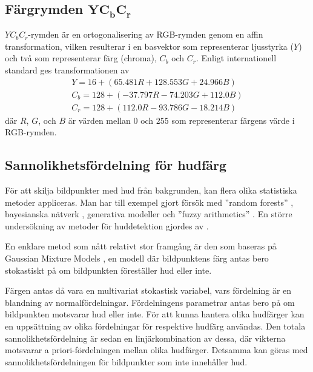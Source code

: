 \documentclass[../rapport_MVEX01-11-05]{subfiles}
\begin{document}
\subsection[Färgrymden $\mathrm{YC_bC_r}$]{Färgrymden $\mathbf{YC_bC_r}$}
$YC_bC_r$-rymden är en ortogonalisering av RGB-rymden genom en
affin transformation, vilken resulterar i en basvektor som
representerar ljusstyrka ($Y$) och två som representerar färg (chroma), $C_b$ och $C_r$. Enligt
internationell standard \cite{ITU-BT601} ges
transformationen av
\begin{equation*}
  \label{eq:farg:ycbcr}
  \begin{gathered}
  Y   = 16  + ( 65.481R + 128.553G + 24.966B)\\
  C_b = 128 + (-37.797R - 74.203G  + 112.0B )\\
  C_r = 128 + (112.0R   - 93.786G  - 18.214B)
  \end{gathered}
\end{equation*}
där $R$, $G$, och $B$ är värden mellan $0$ och $255$ som representerar
färgens värde i RGB-rymden.

\subsection{Sannolikhetsfördelning för hudfärg}\label{sec:klassificering:hud}
För att skilja bildpunkter med hud från bakgrunden,
kan flera olika statistiska metoder
appliceras. Man har till exempel gjort försök med 
''random forests''
\cite{Khan10}, bayesianska nätverk \cite{Sebe04}, generativa modeller
\cite{Kruppa02}
och ''fuzzy arithmetics'' \cite{Shang10}. En större undersökning av metoder
för huddetektion gjordes av .

En enklare metod som nått relativt stor framgång är den som baseras på
Gaus\-sian Mixture Models \cite{Elmezain08,Hassanpour08}, en modell där
bildpunktens färg antas bero stokastiskt på om
bildpunkten föreställer hud eller inte.

Färgen antas då vara en multivariat stokastisk variabel, vars
fördelning är en blandning av normalfördelningar. Fördelningens parametrar
antas bero på om bildpunkten motsvarar hud eller inte. För att kunna
hantera olika hudfärger kan en
uppsättning av olika
fördelningar för respektive hudfärg användas. Den totala
sannolikhetsfördelning är sedan en linjärkombination av dessa, där
vikterna motsvarar a priori-fördelningen mellan olika hudfärger. Detsamma
kan göras med sannolikhetsfördelningen för bildpunkter som inte
innehåller hud.
\end{document}
